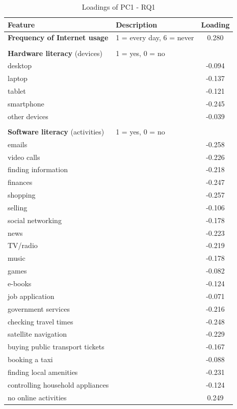 \begin{table}[h!]
    \centering
    \caption{Loadings of PC1 - RQ1}
    \label{tab:pc1_loadings_rq1}
    \begin{tabular}{llc}
        \toprule
        Feature & Description & Loading \\
        \midrule
        \textbf{Frequency of Internet usage} & 1 = every day, 6 = never & 0.280 \\
        & & \\
        \textbf{Hardware literacy} (devices) & 1 = yes, 0 = no & \\
        desktop &  & -0.094 \\
        laptop &  & -0.137 \\
        tablet &  & -0.121 \\
        smartphone &  & -0.245 \\
        other devices &  & -0.039 \\
        & & \\
        \textbf{Software literacy} (activities) & 1 = yes, 0 = no & \\
        emails &  & -0.258 \\
        video calls &  & -0.226 \\
        finding information &  & -0.218 \\
        finances &  & -0.247 \\
        shopping &  & -0.257 \\
        selling &  & -0.106 \\
        social networking &  & -0.178 \\
        news &  & -0.223 \\
        TV/radio &  & -0.219 \\
        music &  & -0.178 \\
        games &  & -0.082 \\
        e-books &  & -0.124 \\
        job application &  & -0.071 \\
        government services &  & -0.216 \\
        checking travel times &  & -0.248 \\
        satellite navigation &  & -0.229 \\
        buying public transport tickets &  & -0.167 \\
        booking a taxi &  & -0.088 \\
        finding local amenities &  & -0.231 \\
        controlling household appliances &  & -0.124 \\
        no online activities &  & 0.249 \\
        \bottomrule
    \end{tabular}
\end{table}

